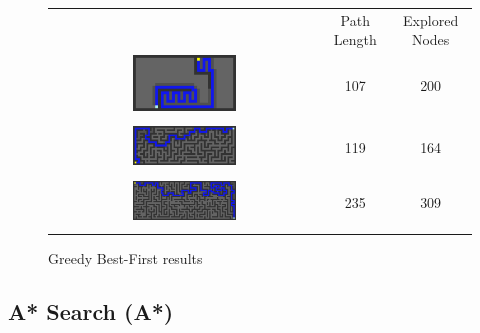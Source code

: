 \documentclass{article}
\begin{document}
\begin{figure}
	\centering
	\begin{tabular}{c c c}
		& Path Length & Explored Nodes \\
		\includegraphics[width=0.4\textwidth]{open_gbf.png} & 107 & 200 \\
		\hline \vspace{-0.1cm} \\
		\includegraphics[width=0.4\textwidth]{medium_gbf.png} & 119 & 164 \\
		\hline \vspace{-0.1cm} \\
		\includegraphics[width=0.4\textwidth]{large_gbf.png} & 235 & 309 \\
		\hline \vspace{-0.1cm} \\
	\end{tabular}

	\caption{Greedy Best-First results}
	\label{fig:greedy_pictures}
\end{figure}



\subsection{A* Search (A*)}
\end{document}
